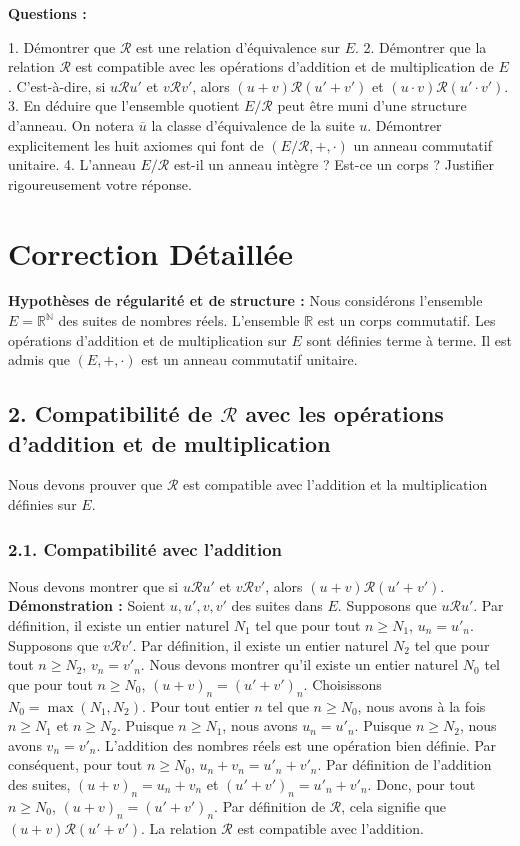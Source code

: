 \documentclass{report}
\begin{document}
\textbf{Questions :}

1.  Démontrer que $\mathcal{R}$ est une relation d'équivalence sur $E$.
2.  Démontrer que la relation $\mathcal{R}$ est compatible avec les opérations d'addition et de multiplication de $E$. C'est-à-dire, si $u \mathcal{R} u'$ et $v \mathcal{R} v'$, alors $(u+v) \mathcal{R} (u'+v')$ et $(u \cdot v) \mathcal{R} (u' \cdot v')$.
3.  En déduire que l'ensemble quotient $E/\mathcal{R}$ peut être muni d'une structure d'anneau. On notera $\overline{u}$ la classe d'équivalence de la suite $u$. Démontrer explicitement les huit axiomes qui font de $(E/\mathcal{R}, +, \cdot)$ un anneau commutatif unitaire.
4.  L'anneau $E/\mathcal{R}$ est-il un anneau intègre ? Est-ce un corps ? Justifier rigoureusement votre réponse.

\section*{Correction Détaillée}

\textbf{Hypothèses de régularité et de structure :}
Nous considérons l'ensemble $E = \mathbb{R}^{\mathbb{N}}$ des suites de nombres réels. L'ensemble $\mathbb{R}$ est un corps commutatif. Les opérations d'addition et de multiplication sur $E$ sont définies terme à terme. Il est admis que $(E, +, \cdot)$ est un anneau commutatif unitaire.



\subsection*{2. Compatibilité de $\mathcal{R}$ avec les opérations d'addition et de multiplication}

Nous devons prouver que $\mathcal{R}$ est compatible avec l'addition et la multiplication définies sur $E$.

\subsubsection*{2.1. Compatibilité avec l'addition}
Nous devons montrer que si $u \mathcal{R} u'$ et $v \mathcal{R} v'$, alors $(u+v) \mathcal{R} (u'+v')$.
\textbf{Démonstration :}
Soient $u, u', v, v'$ des suites dans $E$.
Supposons que $u \mathcal{R} u'$. Par définition, il existe un entier naturel $N_1$ tel que pour tout $n \ge N_1$, $u_n = u'_n$.
Supposons que $v \mathcal{R} v'$. Par définition, il existe un entier naturel $N_2$ tel que pour tout $n \ge N_2$, $v_n = v'_n$.
Nous devons montrer qu'il existe un entier naturel $N_0$ tel que pour tout $n \ge N_0$, $(u+v)_n = (u'+v')_n$.
Choisissons $N_0 = \max(N_1, N_2)$.
Pour tout entier $n$ tel que $n \ge N_0$, nous avons à la fois $n \ge N_1$ et $n \ge N_2$.
Puisque $n \ge N_1$, nous avons $u_n = u'_n$.
Puisque $n \ge N_2$, nous avons $v_n = v'_n$.
L'addition des nombres réels est une opération bien définie. Par conséquent, pour tout $n \ge N_0$, $u_n + v_n = u'_n + v'_n$.
Par définition de l'addition des suites, $(u+v)_n = u_n + v_n$ et $(u'+v')_n = u'_n + v'_n$.
Donc, pour tout $n \ge N_0$, $(u+v)_n = (u'+v')_n$.
Par définition de $\mathcal{R}$, cela signifie que $(u+v) \mathcal{R} (u'+v')$.
La relation $\mathcal{R}$ est compatible avec l'addition.
\end{document}
